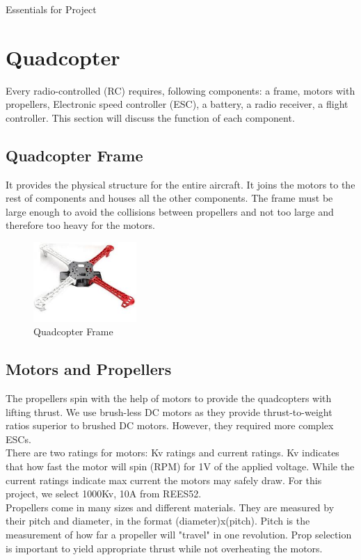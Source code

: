 \documentclass[12pt, oneside]{report}
\numberwithin{equation}{section}
\begin{document}
\begin{chapter}{Essentials for Project}
 
\section{Quadcopter}
Every radio-controlled (RC) requires, following components: a frame, motors with propellers, Electronic speed controller (ESC), a battery, a radio receiver, a flight controller. This section will discuss the function of each component.

\subsection{Quadcopter Frame}

It provides the physical structure for the entire aircraft. It joins the motors to the rest of components and houses all the other components. The frame must be large enough to avoid the collisions between propellers and not too large and therefore too heavy for the motors.
\begin{figure}
	\center
    \includegraphics[width=0.35\textwidth]{frame}
    \caption{Quadcopter Frame}
\end{figure}    
    

\subsection{Motors and Propellers}

The propellers spin with the help of motors to provide the quadcopters with lifting thrust. We use brush-less DC motors as they provide thrust-to-weight ratios superior to brushed DC motors. However, they required more complex ESCs.\\
There are two ratings for motors: Kv ratings and current ratings. Kv indicates that how fast the motor will spin (RPM) for 1V of the applied voltage. While the current ratings indicate max current the motors may safely draw. For this project, we select 1000Kv, 10A from REES52. \\
Propellers come in many sizes and different materials. They are measured by their pitch and diameter, in the format (diameter)x(pitch). Pitch is the measurement of how far a propeller will "travel" in one revolution. Prop selection is important to yield appropriate thrust while not overheating the motors.


\end{chapter}
\end{document}

